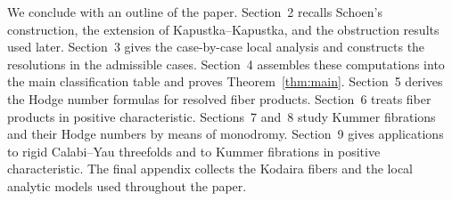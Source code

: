 \documentclass[a4paper]{amsart}
\theoremstyle{plain}
\theoremstyle{definition}
\theoremstyle{remark}
\numberwithin{equation}{section}
\newcommand\tylda[1]{\ThisStyle{%
		\setbox0=\hbox{$\SavedStyle#1$}%
		\stackengine{-.1\LMpt}{$\SavedStyle#1$}{%
			\stretchto{\scaleto{\SavedStyle\mkern.2mu\AC}{.5150\wd0}}{.6\ht0}%
		}{O}{c}{F}{T}{S}%
}}
\newcommand{\PP}{\mathbb{P}}
\begin{document}
We conclude with an outline of the paper.  Section~2 recalls Schoen's
construction, the extension of
Kapustka--Kapustka, and the obstruction results used later.  Section~3 gives
the case-by-case local analysis and constructs the resolutions in the
admissible cases.  Section~4 assembles these computations into the main
classification table and proves Theorem~\ref{thm:main}.  Section~5 derives
the Hodge number formulas for resolved fiber products.  Section~6 treats
fiber products in positive characteristic.  Sections~7 and~8 study Kummer
fibrations and their Hodge numbers by means of monodromy.  Section~9 gives
applications to rigid Calabi--Yau threefolds and to Kummer fibrations in
positive characteristic.  The final appendix collects the Kodaira fibers
and the local analytic models used throughout the paper.

\end{document}

